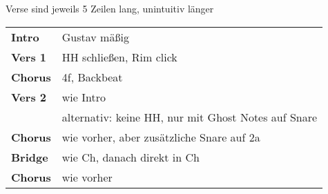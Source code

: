 
Verse sind jeweils 5 Zeilen lang, unintuitiv länger

\begin{tabular}{p{1.6cm}l}
	\textbf{Intro}  & Gustav mäßig                                        \\
	\textbf{Vers 1} & HH schließen, Rim click                             \\
	\textbf{Chorus} & 4f, Backbeat                                        \\ %
	\textbf{Vers 2} & wie Intro                                           \\
	                & alternativ: keine HH, nur mit Ghost Notes auf Snare \\
	\textbf{Chorus} & wie vorher, aber zusätzliche Snare auf 2a           \\
	\textbf{Bridge} & wie Ch, danach direkt in Ch                         \\
	\textbf{Chorus} & wie vorher                                          \\
\end{tabular}
